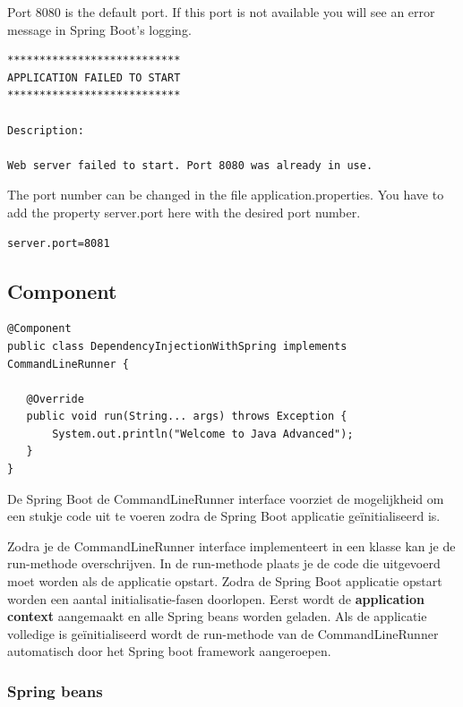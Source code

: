 Port 8080 is the default port. If this port is not available you will see an error message in Spring Boot's logging.

\begin{lstlisting}[frame=single]
***************************
APPLICATION FAILED TO START
***************************

Description:

Web server failed to start. Port 8080 was already in use.
\end{lstlisting}

The port number can be changed in the file application.properties. You have to add the property server.port here with the desired port number.

\begin{lstlisting}[frame=single]
server.port=8081
\end{lstlisting}

\subsection{Component}


\begin{lstlisting}
@Component
public class DependencyInjectionWithSpring implements CommandLineRunner {
   
   @Override    
   public void run(String... args) throws Exception {
	   System.out.println("Welcome to Java Advanced");
   }
}
\end{lstlisting}

De Spring Boot de CommandLineRunner interface voorziet de mogelijkheid om een stukje code uit te voeren zodra de Spring Boot applicatie ge\"initialiseerd is. 

Zodra je de CommandLineRunner interface implementeert in een klasse kan je de run-methode overschrijven. In de run-methode plaats je de code die uitgevoerd moet worden
als de applicatie opstart.  Zodra de Spring Boot applicatie opstart worden een aantal initialisatie-fasen doorlopen.  Eerst wordt de \textbf{application context} aangemaakt en alle Spring beans worden geladen. Als de applicatie volledige is ge\"initialiseerd wordt de run-methode van de CommandLineRunner automatisch door het Spring boot framework aangeroepen.



\subsubsection{Spring beans}

